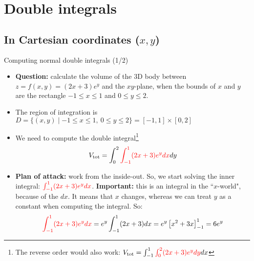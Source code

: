 \section{Double integrals}
\subsection{In Cartesian coordinates ($x,y$)}
\iffalse
\begin{frame}{Double integrals (intuition)}
    Sometimes we need to take an integral over a integral.
    This is useful for example when calculating the volume of a 3D body.
    \begin{itemize}
        \item \textbf{Question:} calculate the volume of the 3D body between $z=f(x,y)=(2x+3)e^y$ and the $xy$-plane, when the bounds of $x$ and $y$ are the rectangle $-1\leq x\leq1$ and $0\leq y\leq2$.
        \item \textbf{Intuition:} the volume consists of a large number of very small ``boxes'' (3D-rectangles). The volume of one such ``box" is $\text{length}\cdot\text{width}\cdot\text{height}=dx\cdot dy\cdot(2x+3)e^y$. The total volume of the 3D body must be the sum of all these little boxes, i.e., an integral:
            \[V_{\text{tot}}=\int_{0}^{2}\int_{-1}^{1}(2x+3)e^y dxdy=\int_{-1}^{1}\int_{0}^{2}(2x+3)e^y dydx\]
        The next slides cover how to compute such a double integral.
    \item    \textbf{Note:} in the case of a rectangle, the order of integration does not matter (that's why the two double integals above are equivalent).
    \end{itemize}
\end{frame}
\fi


\begin{frame}{Computing normal double integrals (1/2)}
    \footnotesize
    \begin{itemize}
        \item \textbf{Question:} calculate the volume of the 3D body between $z=f(x,y)=(2x+3)e^y$ and the $xy$-plane, when the bounds of $x$ and $y$ are the rectangle $-1\leq x\leq1$ and $0\leq y\leq2$.
        \item The region of integration is $D=\{(x,y)\mid-1\leq x\leq1,~ 0\leq y\leq2\}=[-1,1]\times[0,2]$
        \item We need to compute the double integral\footnote{The reverse order would also work:
            $V_{\text{tot}}=\int_{-1}^{1}\textcolor{red}{\int_{0}^{2}(2x+3)e^y dy}dx$}
            \[V_{\text{tot}}=\int_{0}^{2}\textcolor{red}{\int_{-1}^{1}(2x+3)e^y dx}dy\]
        \item \textbf{Plan of attack:} work from the inside-out. So, we start solving the inner integral: $\textcolor{red}{\int_{-1}^{1}(2x+3)e^y dx}$. \textbf{Important:} this is an integral in the ``$x$-world", because of the $dx$. It means that $x$ changes, whereas we can treat $y$ as a constant when computing the integral. So:
            \[\textcolor{red}{\int_{-1}^{1}(2x+3)e^y dx}=e^y\int_{-1}^1(2x+3)dx=e^y\left[x^2+3x\right]_{-1}^1=6e^y\]
    \end{itemize}
\end{frame}

